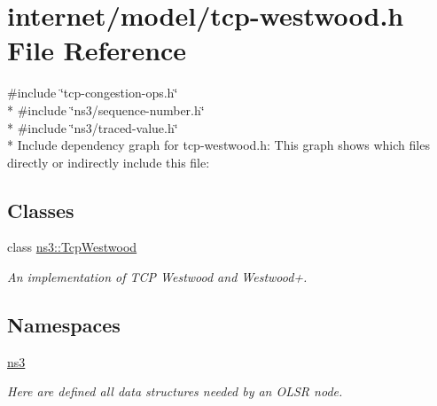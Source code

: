 \hypertarget{tcp-westwood_8h}{}\section{internet/model/tcp-\/westwood.h File Reference}
\label{tcp-westwood_8h}
{\ttfamily \#include \char`\"{}tcp-\/congestion-\/ops.\+h\char`\"{}}\\*
{\ttfamily \#include \char`\"{}ns3/sequence-\/number.\+h\char`\"{}}\\*
{\ttfamily \#include \char`\"{}ns3/traced-\/value.\+h\char`\"{}}\\*
Include dependency graph for tcp-\/westwood.h\+:
This graph shows which files directly or indirectly include this file\+:
\subsection*{Classes}
\begin{DoxyCompactItemize}
\item 
class \hyperlink{classns3_1_1TcpWestwood}{ns3\+::\+Tcp\+Westwood}
\begin{DoxyCompactList}\small\item\em An implementation of T\+CP Westwood and Westwood+. \end{DoxyCompactList}\end{DoxyCompactItemize}
\subsection*{Namespaces}
\begin{DoxyCompactItemize}
\item 
 \hyperlink{namespacens3}{ns3}
\begin{DoxyCompactList}\small\item\em Here are defined all data structures needed by an O\+L\+SR node. \end{DoxyCompactList}\end{DoxyCompactItemize}
